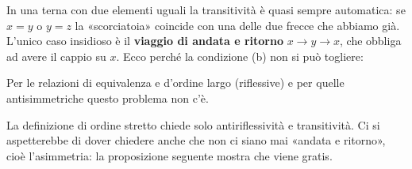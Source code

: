 \begin{spiegazione}
    In una terna con due elementi uguali la transitività è quasi sempre automatica: se $x = y$ o $y = z$ la «scorciatoia»
    coincide con una delle due frecce che abbiamo già. L'unico caso insidioso è il \textbf{viaggio di andata e ritorno}
    $x \to y \to x$, che obbliga ad avere il cappio su $x$. Ecco perché la condizione (b) non si può togliere:
    \begin{center}
    \end{center}
    Per le relazioni di equivalenza e d'ordine largo (riflessive) e per quelle antisimmetriche questo problema non c'è.
\end{spiegazione}

La definizione di ordine stretto chiede solo antiriflessività e transitività. Ci si aspetterebbe di dover chiedere anche
che non ci siano mai «andata e ritorno», cioè l'asimmetria: la proposizione seguente mostra che viene gratis.

